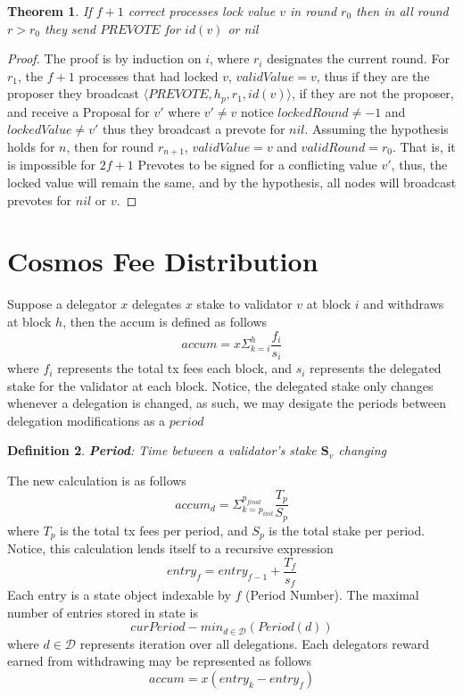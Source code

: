 \documentclass{amsart}
\numberwithin{equation}{section}
\theoremstyle{plain}
\newtheorem{thm}{Theorem}[section]
\newtheorem{dfn}[thm]{Definition}
\theoremstyle{definition}
\begin{document}
\begin{thm} 
  If $f + 1$ correct processes lock value $v$ in round $r_0$ then in all round $r > r_0$ they send $PREVOTE$ for $id(v)$ or nil 
\end{thm}
\begin{proof}
  The proof is by induction on $i$, where $r_i$ designates the current round. For $r_1$, the $f + 1$ processes that had locked $v$, $validValue = v$, thus if they are the proposer they broadcast $\langle PREVOTE, h_p, r_1, id(v) \rangle$, if they are not the proposer, and receive a Proposal for $v'$ where $v' \not= v$ notice $lockedRound \not= -1$ and $lockedValue \not= v'$ thus they broadcast a prevote for $nil$.
  Assuming the hypothesis holds for $n$, then for round $r_{n + 1}$, $validValue = v$ and $validRound = r_0$. That is, it is impossible for $2f + 1$ Prevotes to be signed for a conflicting value $v'$, thus, the locked value will remain the same, and by the hypothesis, all nodes will broadcast prevotes for $nil$ or $v$.
\end{proof}

\section{Cosmos Fee Distribution}
Suppose a delegator $x$ delegates $x$ stake to validator $v$ at block $i$ and withdraws at block $h$, then the accum is defined as follows
\begin{equation}
  accum = x \Sigma_{k = i}^h \frac{f_i}{s_i}
\end{equation}
where $f_i$ represents the total tx fees each block, and $s_i$ represents the delegated stake for the validator at each block. 
Notice, the delegated stake only changes whenever a delegation is changed, as such, we may desigate the periods between delegation modifications as a $period$
\begin{dfn}
  \textbf{Period}: Time between a validator's stake $\textbf{S}_v$ changing
\end{dfn}
The new calculation is as follows 
\begin{equation} 
  accum_{d} = \Sigma_{k = p_{init}}^{p_{final}} \frac{T_p}{S_p}
\end{equation}
where $T_p$ is the total tx fees per period, and $S_p$ is the total stake per period.
Notice, this calculation lends itself to a recursive expression 
\begin{equation}
  entry_f  = entry_{f-1} + \frac{T_f}{s_f}
\end{equation}
Each entry is a state object indexable by $f$ (Period Number). The maximal number of entries stored in state is 
\begin{equation} 
  curPeriod - min_{d \in \mathcal{D}}(Period(d))
\end{equation}
where $d \in \mathcal{D}$ represents iteration over all delegations. Each delegators reward earned from withdrawing may be represented as follows
\begin{equation}
  accum = x(entry_k - entry_f)
\end{equation}
\end{document}
